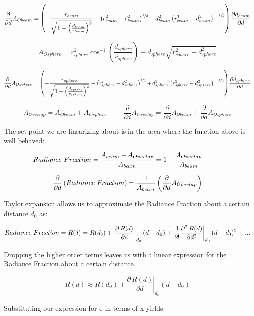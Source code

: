 \documentclass{article}
\theoremstyle{plain}
\theoremstyle{definition}
\theoremstyle{remark}
\begin{document}
$$ \frac{\partial}{\partial d} A_{Obeam} = \left( -\frac{r_{beam}}{\sqrt{1 - \left(\frac{d_{beam}}{r_{beam}}\right)^2}} - \left( r_{beam}^2 - d_{beam}^2\right)^{\sfrac{1}{2}} + d_{beam}^2 \left( r_{beam}^2 - d_{beam}^2\right)^{\sfrac{-1}{2}} \right) \frac{\partial d_{beam}}{\partial d}$$

$$ A_{Osphere} = r_{sphere}^2 \cos^{-1} (\frac{d_{sphere}}{r_{sphere}})-d_{sphere} \sqrt{r_{sphere}^2-d_{sphere}^2} $$

$$ \frac{\partial}{\partial d} A_{Osphere} = \left( -\frac{r_{sphere}}{\sqrt{1 - \left(\frac{d_{sphere}}{r_{sphere}}\right)^2}} - \left( r_{sphere}^2 - d_{sphere}^2\right)^{\sfrac{1}{2}} + d_{sphere}^2 \left( r_{sphere}^2 - d_{sphere}^2\right)^{\sfrac{-1}{2}} \right) \frac{\partial d_{sphere}}{\partial d}$$

$$ A_{Overlap} = A_{Obeam} + A_{Osphere} \hspace{1cm}  \frac{\partial}{\partial d} A_{Overlap} = \frac{\partial}{\partial d} A_{Obeam} + \frac{\partial}{\partial d} A_{Osphere} $$

The set point we are linearizing about is in the area where the function above is well behaved:

$$ Radiance \hspace{0.1cm} Fraction = \frac{A_{beam} - A_{Overlap}}{A_{beam}} = 1 - \frac{A_{Overlap}}{A_{beam}} \hspace{1cm} $$

$$ \frac{\partial}{\partial d} \left( Radiance \hspace{0.1cm} Fraction \right) = \frac{1}{A_{beam}} \left( \frac{\partial}{\partial d} A_{Overlap} \right) $$

Taylor expansion allows us to approximate the Radiance Fraction about a certain distance $d_0$ as:

$$ Radiance \hspace{0.1cm} Fraction = R(d) = R(d_{0}) + \left. \frac{\partial \, R(d)}{\partial d} \right|_{d_{0}} \left( d - d_{0} \right) + \left. \frac{1}{2!} \frac{\partial^2 \, R(d)}{\partial d^2} \right|_{d_{0}} \left(d-d_{0}\right)^2 + ... $$

Dropping the higher order terms leaves us with a linear expression for the Radiance Fraction about a certain distance.

$$ R(d) \approx R(d_{0}) + \left. \frac{\partial \, R(d)}{\partial d} \right|_{d_{0}} \left( d - d_{0} \right) $$

Substituting our expression for d in terms of x yields:
\end{document}
